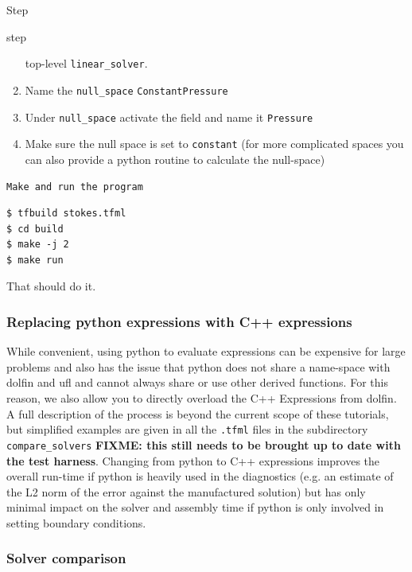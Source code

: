 \begin{steps}{Step}
\begin{steps}{step}
\begin{enumerate}
      top-level \texttt{linear\_solver}.
    \item Name the \texttt{null\_space} \texttt{ConstantPressure}
    \item Under \texttt{null\_space} activate the field and name it \texttt{Pressure}
    \item Make sure the null space is set to \texttt{constant} (for
      more complicated spaces you can also provide a python routine to
      calculate the null-space)
    \end{enumerate}
  \end{steps}
\item \texttt{Make and run the program}
  \begin{lstlisting}[style=bash]
$ tfbuild stokes.tfml
$ cd build
$ make -j 2 
$ make run
\end{lstlisting}


\end{steps}

That should do it.  

\subsubsection{Replacing python expressions with C++ expressions}

While convenient, using python to evaluate expressions can be
expensive for large problems and also has the issue that python does
not share a name-space with dolfin and ufl and cannot always share or
use other derived functions.  For this reason, we also allow you to
directly overload the C++ Expressions from dolfin.  A full description
of the process is beyond the current scope of these tutorials, but
simplified examples are given in all the \texttt{.tfml} files in the
subdirectory \texttt{compare\_solvers} \textbf{FIXME: this still needs
  to be brought up to date with the test harness}. Changing from
python to C++ expressions improves the overall run-time if python is
heavily used in the diagnostics (e.g. an estimate of the L2 norm of
the error against the manufactured solution) but has only minimal
impact on the solver and assembly time if python is only involved in
setting boundary conditions.

\subsubsection{Solver comparison}
\label{sec:solver-comparison}

